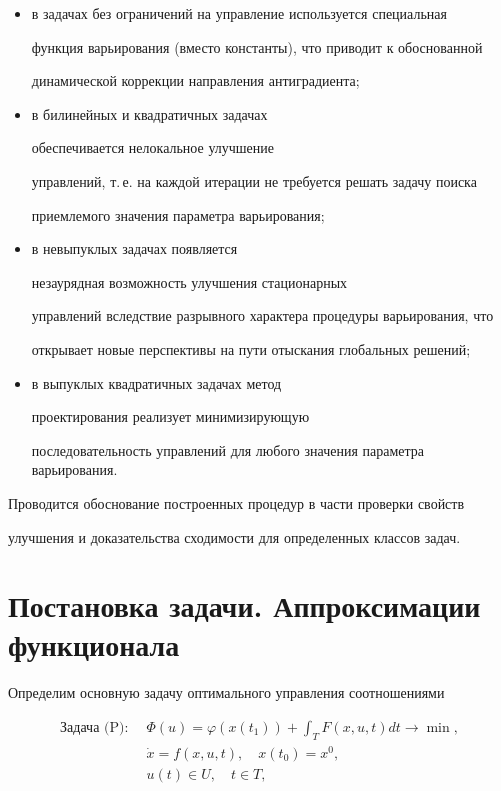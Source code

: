 \begin{itemize}


\item[---] в задачах без ограничений на управление используется специальная


функция варьирования (вместо константы), что приводит к обоснованной


динамической коррекции направления антиградиента;


\item[---] в билинейных и квадратичных задачах


обеспечивается нелокальное улучшение 


управлений, т.\,е. на каждой итерации не требуется решать задачу поиска 


приемлемого значения параметра варьирования;


\item[---] в невыпуклых задачах появляется


незаурядная возможность улучшения стационарных


управлений вследствие разрывного характера процедуры варьирования, что


открывает новые перспективы на пути отыскания глобальных решений;


\item[---] в выпуклых квадратичных задачах метод 


проектирования реализует минимизирующую


последовательность управлений для любого значения параметра варьирования.


\end{itemize}





Проводится обоснование построенных процедур в части проверки свойств


улучшения и доказательства сходимости для определенных классов задач.





\section{Постановка задачи. Аппроксимации функционала} 





Определим основную задачу оптимального управления соотношениями


\begin{align}


\text{Задача (P):} \ \; 


&\Phi(u)=\varphi(x(t_{1}))+\int_{T} F(x, u, t) dt \rightarrow \min, \\


%


&\Dot{x}=f(x, u, t), \quad x(t_{0})=x^{0},\\


& u(t)\in U, \quad t\in T,


\end{align}


